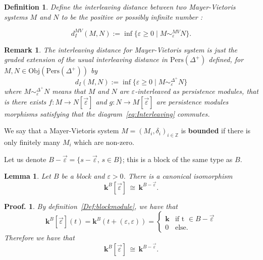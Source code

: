 \documentclass[a4paper, english, 11pt]{article}
\newcommand{\kk}[0]{\textbf{k}}
\newcommand{\Pe}{\text{Pers}}
\newcommand{\0}{\vec{0}}
\newcommand{\Z}[0]{\mathbb{Z}}
\newcommand{\Obj}[0]{\text{Obj}}
\newtheorem*{pf}{Proof.} }
\newtheorem{remark}[prop]{Remark}
\newtheorem{lem}[prop]{Lemma}
\newtheorem{defi}[prop]{Definition}
\begin{document}
\begin{defi}\label{D:InterleavingforMV}
Define the interleaving distance between two Mayer-Vietoris systems $M$ and $N$ to be the positive or possibly infinite number : 

$$d_I^{MV}(M,N) := \inf \{\varepsilon \geq 0 \mid M \sim_\varepsilon^{MV} N  \}. $$
\end{defi}
\begin{remark}\label{R:DMVgeneralizedDstandard}
 The interleaving distance for Mayer-Vietoris system is just the graded extension of the usual interleaving distance in $\Pe(\Delta^+)$ defined, for $M, N \in \Obj(\Pe(\Delta^+))$ by 
 $$d_I(M,N) := \inf \{\varepsilon \geq 0 \mid M \sim_\varepsilon^{\Delta^+} N  \} $$
 where $M \sim_\varepsilon^{\Delta^+} N$ means that $M$ and $N$ are $\varepsilon$-interleaved as persistence modules, that is there  exists $f: M\to N[\vec{\varepsilon}]$ and $g: N\to M[\vec{\varepsilon}]$ are persistence modules morphisms satisfying that the diagram~\eqref{eq:Interleaving} commutes. 
 
\end{remark}

 We say that a Mayer-Vietoris system $M=(M_i,\delta_i)_{i\in \Z}$ is \textbf{bounded} if there is only finitely many $M_i$ which are non-zero.
 
 
 

Let us denote $B -\vec{\varepsilon}=\{ s -\vec{\varepsilon}, \, s\in B\}$; this is a block of the same type as $B$.
\begin{lem}\label{L:shiftofBlock}
 Let $B$ be a block and $\varepsilon >0$. There is a canonical isomorphism 
 $$\kk^B[\vec{\varepsilon}] \, \cong \, \kk^{B-\vec{\varepsilon}}. $$
\end{lem}
\begin{pf}
 By definition~\ref{Def:blockmodule}, we have that 
 $$\kk^B[\vec{\varepsilon}](t)= \kk^B(t+(\varepsilon, \varepsilon)) = \left\{ \begin{array}{ll} 
\kk & \text{if t }\in B -\vec{\varepsilon} \\
0 & \text{else.}\end{array}\right.$$
Therefore we have that $$\kk^B[\vec{\varepsilon}] \, \cong \, \kk^{B-\vec{\varepsilon}}.$$
\end{pf}
\end{document}
